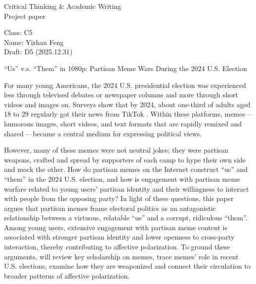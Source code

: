 \documentclass[12pt,twoside]{article}
\begin{document}
{\fontsize{16}{35}\selectfont
Critical Thinking \& Academic Writing\\
Project paper\par
}

\vspace{-0.5\baselineskip}

Class: C5 \\
Name: Yizhan Feng \\
Draft: D5 (2025.12.31) \\

\vspace{-0.75\baselineskip}

\begin{center}
{\fontsize{14}{17}\selectfont
``Us'' v.s. ``Them'' in 1080p: Partisan Meme Wars During the 2024 U.S. Election\par
}
\end{center}

\vspace{-\baselineskip}


For many young Americans, the 2024 U.S. presidential election was experienced less through televised debates or newspaper columns and more through short videos and images on. Surveys show that by 2024, about one-third of adults aged 18 to 29 regularly got their news from TikTok \parencite{shearer2024newsTikTokXFacebookInstagram}. Within these platforms, memes---humorous images, short videos, and text formats that are rapidly remixed and shared \parencite[39]{shifman2013memesdigitalculture}---became a central medium for expressing political views.

However, many of these memes were not neutral jokes; they were partisan weapons, crafted and spread by supporters of each camp to hype their own side and mock the other. How do partisan memes on the Internet construct ``us'' and ``them'' in the 2024 U.S. election, and how is engagement with partisan meme warfare related to young users' partisan identity and their willingness to interact with people from the opposing party? In light of these questions, this paper argues that partisan memes frame electoral politics as an antagonistic relationship between a virtuous, relatable ``us'' and a corrupt, ridiculous ``them''. Among young users, extensive engagement with partisan meme content is associated with stronger partisan identity and lower openness to cross-party interaction, thereby contributing to affective polarization. To ground these arguments, will review key scholarship on memes, trace memes' role in recent U.S. elections, examine how they are weaponized and connect their circulation to broader patterns of affective polarization.
\end{document}
